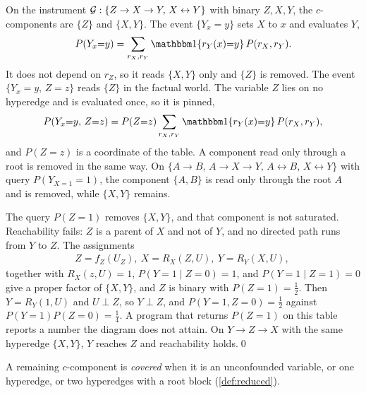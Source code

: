 \begin{example}
  \label{ex:instrument}
  On the instrument $\mathcal{G}:\{Z\to X\to Y,\,X\leftrightarrow Y\}$ with binary $Z,X,Y$, the $c$-components are $\{Z\}$ and $\{X,Y\}$. The event $\{Y_x{=}y\}$ sets $X$ to $x$ and evaluates $Y$,
  \begin{equation}
  P(Y_x{=}y)=\sum_{r_X,r_Y}\I\{r_Y(x){=}y\}\,P(r_X,r_Y).
  \end{equation}
  It does not depend on $r_Z$, so it reads $\{X,Y\}$ only and $\{Z\}$ is removed. The event $\{Y_x{=}y,\,Z{=}z\}$ reads $\{Z\}$ in the factual world. The variable $Z$ lies on no hyperedge and is evaluated once, so it is pinned,
  \begin{equation}
  P(Y_x{=}y,\,Z{=}z)
  =
  P(Z{=}z)\sum_{r_X,r_Y}\I\{r_Y(x){=}y\}\,P(r_X,r_Y),
  \end{equation}
  and $P(Z{=}z)$ is a coordinate of the table. A component read only through a root is removed in the same way. On $\{A\to B,\,A\to X\to Y,\,A\leftrightarrow B,\,X\leftrightarrow Y\}$ with query $P(Y_{X=1}{=}1)$, the component $\{A,B\}$ is read only through the root $A$ and is removed, while $\{X,Y\}$ remains.

  The query $P(Z{=}1)$ removes $\{X,Y\}$, and that component is not saturated. Reachability fails: $Z$ is a parent of $X$ and not of $Y$, and no directed path runs from $Y$ to $Z$. The assignments
  \begin{align*}
  Z = f_Z(U_Z), \
  X = R_X(Z,U), \
  Y = R_Y(X,U), \
  \end{align*}
  together with $R_X(z,U)=1$, $P(Y{=}1\mid Z{=}0)=1$, and $P(Y{=}1\mid Z{=}1)=0$ give a proper factor of $\{X,Y\}$, and $Z$ is binary with $P(Z{=}1)=\tfrac12$. Then $Y=R_Y(1,U)$ and $U\perp Z$, so $Y\perp Z$, and $P(Y{=}1,Z{=}0)=\tfrac12$ against $P(Y{=}1)P(Z{=}0)=\tfrac14$. A program that returns $P(Z{=}1)$ on this table reports a number the diagram does not attain. On $Y\to Z\to X$ with the same hyperedge $\{X,Y\}$, $Y$ reaches $Z$ and reachability holds.\qed
\end{example}

\begin{definition}[Covering]
  \label{def:covering}
  A remaining $c$-component is \emph{covered} when it is an unconfounded variable, or one hyperedge, or two hyperedges with a root block (\cref{def:reduced}).
\end{definition}

